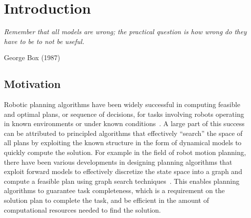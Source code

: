 
\chapter{Introduction}
\label{cha:introduction}

\epigraph{\textit{Remember that all models are wrong; the practical
    question is how wrong do they have to be to not be
    useful.}}{George Box (1987)}

\section{Motivation}
\label{sec:motivation}

Robotic planning algorithms have been widely successful in computing
feasible and optimal plans, or sequence of decisions, for tasks
involving robots operating in known environments or under known
conditions~\cite{DBLP:books/cu/L2006}. A large part of this success
can be attributed to principled algorithms that effectively
``search'' the space of all plans by exploiting the known
structure in the form of dynamical models to quickly compute the
solution. For example in the field of robot motion planning, there
have been various developments in designing planning algorithms that
exploit forward models to effectively discretize the state space into
a graph and compute a feasible plan using graph search
techniques~\cite{DBLP:books/daglib/0068760}. This enables planning
algorithms to guarantee task 
completeness, which is a requirement on the solution plan to complete
the task, and be efficient in the amount of computational resources
needed to find the solution.

